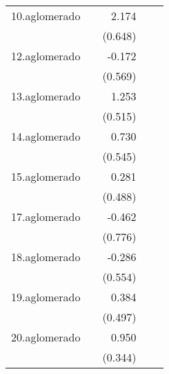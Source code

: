 {\begin{longtable}{l*{4}{D{.}{.}{-1}}}
\addlinespace
10.aglomerado&                     &       2.174\sym{***}&                     &                     \\
            &                     &     (0.648)         &                     &                     \\
\addlinespace
12.aglomerado&                     &      -0.172         &                     &                     \\
            &                     &     (0.569)         &                     &                     \\
\addlinespace
13.aglomerado&                     &       1.253\sym{*}  &                     &                     \\
            &                     &     (0.515)         &                     &                     \\
\addlinespace
14.aglomerado&                     &       0.730         &                     &                     \\
            &                     &     (0.545)         &                     &                     \\
\addlinespace
15.aglomerado&                     &       0.281         &                     &                     \\
            &                     &     (0.488)         &                     &                     \\
\addlinespace
17.aglomerado&                     &      -0.462         &                     &                     \\
            &                     &     (0.776)         &                     &                     \\
\addlinespace
18.aglomerado&                     &      -0.286         &                     &                     \\
            &                     &     (0.554)         &                     &                     \\
\addlinespace
19.aglomerado&                     &       0.384         &                     &                     \\
            &                     &     (0.497)         &                     &                     \\
\addlinespace
20.aglomerado&                     &       0.950\sym{**} &                     &                     \\
            &                     &     (0.344)         &                     &                     \\

\end{longtable}}
